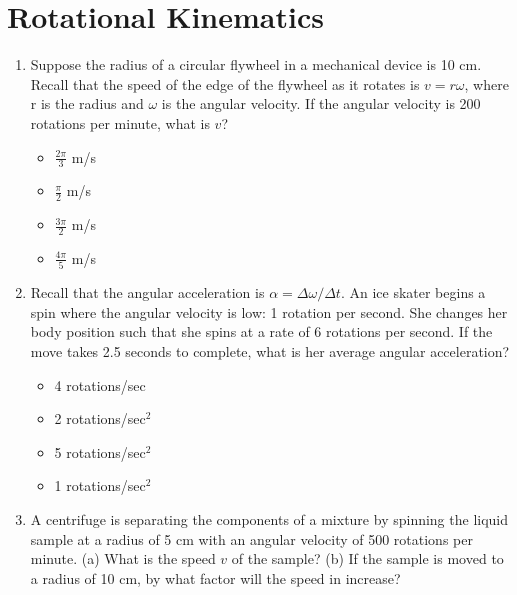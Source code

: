 \documentclass[10pt]{article}
\begin{document}
\maketitle

\section{Rotational Kinematics}
\begin{enumerate}
\item Suppose the radius of a circular flywheel in a mechanical device is 10 cm.  Recall that the speed of the edge of the flywheel as it rotates is $v = r\omega$, where r is the radius and $\omega$ is the angular velocity.  If the angular velocity is 200 rotations per minute, what is $v$?
\begin{itemize}
\item $\frac{2\pi}{3}$ m/s
\item $\frac{\pi}{2}$ m/s
\item $\frac{3\pi}{2}$ m/s
\item $\frac{4\pi}{5}$ m/s
\end{itemize}
\item Recall that the angular acceleration is $\alpha = \Delta \omega/\Delta t$.  An ice skater begins a spin where the angular velocity is low: 1 rotation per second.  She changes her body position such that she spins at a rate of 6 rotations per second.  If the move takes 2.5 seconds to complete, what is her average angular acceleration?
\begin{itemize}
\item 4 rotations/sec
\item 2 rotations/sec$^2$
\item 5 rotations/sec$^2$
\item 1 rotations/sec$^2$
\end{itemize}
\item A centrifuge is separating the components of a mixture by spinning the liquid sample at a radius of 5 cm with an angular velocity of 500 rotations per minute.  (a) What is the speed $v$ of the sample?  (b) If the sample is moved to a radius of 10 cm, by what factor will the speed in increase? \\ \vspace{1.5cm}
\end{enumerate}
\end{document}
